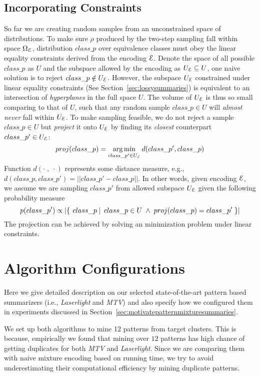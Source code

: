 \begin{appendices}
\subsection{Incorporating Constraints}
So far we are creating random samples from an unconstrained space of distributions. 
To make sure $\rho$ produced by the two-step sampling fall within space $\Omega_\mathcal E$, distribution $class\_p$ over equivalence classes must obey the linear equality constraints derived from the encoding $\mathcal E$.
Denote the space of all possible $class\_p$ as $U$ and the subspace allowed by the encoding as $U_\mathcal E\subseteq U$, one naive solution is to reject $class\_p\notin U_\mathcal E$. 
However, the subspace $U_\mathcal E$ constrained under linear equality constraints (See Section~\ref{sec:lossysummaries}) is equivalent to an intersection of \textit{hyperplanes} in the full space $U$. 
The volume of $U_\mathcal E$ is thus so small comparing to that of $U$, such that any random sample $class\_p\in U$ will \textit{almost never} fall within $U_\mathcal E$.
To make sampling feasible, we do not reject a sample $class\_p\in U$ but \textit{project} it onto $U_\mathcal E$ by finding its \textit{closest} counterpart $class\_p'\in U_\mathcal E$:
$$proj(class\_p)=\operatorname*{arg\,min}\limits_{class\_p'\in U_\mathcal E}d(class\_p',class\_p)$$
Function $d(\cdot\; , \;\cdot)$ represents some distance measure, e.g., $d(class\_p,class\_p')=||class\_p'-class\_p||$. 
In other words, given encoding $\mathcal E$, we assume we are sampling $class\_p'$ from allowed subspace $U_\mathcal E$ given the following probability measure $$p(class\_p')\propto\left|\left\{\left.\;{class\_p}\;\right|\;{class\_p\in U\;\wedge\;proj(class\_p)=class\_p'}\;\right\}\right|$$
The projection can be achieved by solving an minimization problem under linear constraints.

\section{Algorithm Configurations}
\label{appendix:experimentsettingsforpatternbasedalgorithms}
Here we give detailed description on our selected state-of-the-art pattern based summarizers (i.e., \textit{Laserlight} and \textit{MTV}) and also specify how we configured them in experiments discussed in Section~\ref{sec:motivatepatternmixturesummaries}. 

We set up both algorithms to mine 12 patterns from target clusters.
This is because, empirically we found that mining over $12$ patterns has high chance of getting duplicates for both \textit{MTV} and \textit{Laserlight}. 
Since we are comparing them with naive mixture encoding based on running time, we try to avoid underestimating their computational efficiency by mining duplicate patterns.


\end{appendices}
